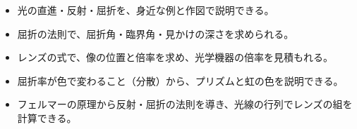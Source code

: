 \newcommand\rxmray[3][bkRed]{\draw[#1, line width=1pt, -{Stealth[length=2.2mm]}] #2 -- ($#2!0.56!#3$);\draw[#1, line width=1pt] ($#2!0.5!#3$) -- #3;}
\newcommand\rxmlens[2]{\draw[bkBlue!70!black, line width=0.9pt, fill=bkBlue!12] (#1,-#2) .. controls (#1+2.6,-#2*0.4) and (#1+2.6,#2*0.4) .. (#1,#2) .. controls (#1-2.6,#2*0.4) and (#1-2.6,-#2*0.4) .. (#1,-#2);}
\newcommand\rxmclens[2]{\draw[bkBlue!70!black, line width=0.9pt, fill=bkBlue!12] (#1-1.8,-#2) -- (#1+1.8,-#2) .. controls (#1+0.4,-#2*0.4) and (#1+0.4,#2*0.4) .. (#1+1.8,#2) -- (#1-1.8,#2) .. controls (#1-0.4,#2*0.4) and (#1-0.4,-#2*0.4) .. (#1-1.8,-#2);}
\newcommand\rxmobj[3]{\draw[#3, line width=1.6pt, -{Stealth[length=2.6mm, width=2.2mm]}] #1 -- ++(0,#2);}
\newcommand\rxmeye[2]{\begin{scope}[shift={#1}, rotate=#2]\draw[bkInk, line width=0.7pt, fill=white] (0,0) .. controls (-2,1.6) and (-4.4,1.4) .. (-5,0) .. controls (-4.4,-1.4) and (-2,-1.6) .. (0,0);\fill[bkInk] (-3.4,0) circle (0.7);\end{scope}}
\makeatother


\begin{goal}
\begin{itemize}[label={\color{bkTheme}●}, leftmargin=1.6\zw, itemsep=0pt, topsep=1pt]
\item {}\enspace 光の直進・反射・屈折を、身近な例と作図で説明できる。
\item {}\enspace 屈折の法則で、屈折角・臨界角・見かけの深さを求められる。
\item {}\enspace レンズの式で、像の位置と倍率を求め、光学機器の倍率を見積もれる。
\item {}\enspace 屈折率が色で変わること（分散）から、プリズムと虹の色を説明できる。
\item {}\enspace フェルマーの原理から反射・屈折の法則を導き、光線の行列でレンズの組を計算できる。
\end{itemize}
\end{goal}

